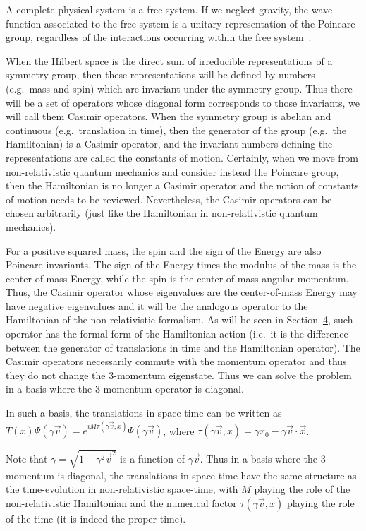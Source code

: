 \documentclass[11pt]{book}
\begin{document}
A complete physical system is a free system. If we neglect gravity, the
wave-function associated to the free system is a unitary representation
of the Poincare group, regardless of the interactions occurring within
the free system~\cite{Wigner1939On}.

When the Hilbert space is the direct sum of irreducible representations
of a symmetry group, then these representations will be defined by
numbers (e.g.~mass and spin) which are invariant under the symmetry
group. Thus there will be a set of operators whose diagonal form
corresponds to those invariants, we will call them Casimir operators.
When the symmetry group is abelian and continuous (e.g.~translation in
time), then the generator of the group (e.g.~the Hamiltonian) is a
Casimir operator, and the invariant numbers defining the representations
are called the constants of motion. Certainly, when we move from
non-relativistic quantum mechanics and consider instead the Poincare
group, then the Hamiltonian is no longer a Casimir operator and the
notion of constants of motion needs to be reviewed. Nevertheless, the
Casimir operators can be chosen arbitrarily (just like the Hamiltonian
in non-relativistic quantum mechanics).

For a positive squared mass, the spin and the sign of the Energy are
also Poincare invariants. The sign of the Energy times the modulus of
the mass is the center-of-mass Energy, while the spin is the
center-of-mass angular momentum. Thus, the Casimir operator whose
eigenvalues are the center-of-mass Energy may have negative eigenvalues
and it will be the analogous operator to the Hamiltonian of the
non-relativistic formalism. As will be seen in
Section~\protect\hyperlink{sec:time}{4}, such operator has the formal
form of the Hamiltonian action (i.e.~it is the difference between the
generator of translations in time and the Hamiltonian operator). The
Casimir operators necessarily commute with the momentum operator and
thus they do not change the 3-momentum eigenstate. Thus we can solve the
problem in a basis where the 3-momentum operator is diagonal.

In such a basis, the translations in space-time can be written as
\(T(x)\Psi(\gamma\vec{v})=e^{i M \tau(\gamma\vec{v}, x)}\Psi(\gamma\vec{v})\),
where \(\tau(\gamma\vec{v}, x)=\gamma x_0-\gamma \vec{v}\cdot \vec{x}\).

Note that \(\gamma=\sqrt{1+\gamma^2\vec{v}^2}\) is a function of
\(\gamma\vec{v}\). Thus in a basis where the 3-momentum is diagonal, the
translations in space-time have the same structure as the time-evolution
in non-relativistic space-time, with \(M\) playing the role of the
non-relativistic Hamiltonian and the numerical factor
\(\tau(\gamma\vec{v}, x)\) playing the role of the time (it is indeed
the proper-time).
\end{document}
